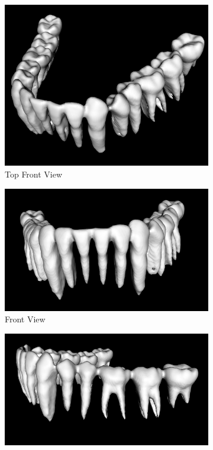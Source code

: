 \documentclass[11.5pt, b5paper]{article}
\begin{document}
\begin{figure}
    \centering
    \begin{subfigure}[b]{0.5\textwidth}
        \centering
        \includegraphics[width=\textwidth]{MCF1}
        \caption{Top Front View}
    \end{subfigure}
    \hfill
    \begin{subfigure}[b]{0.5\textwidth}
        \centering
        \includegraphics[width=\textwidth]{MCF2}
        \caption{Front View}
    \end{subfigure}
      \hfill
    \begin{subfigure}[b]{0.5\textwidth}
        \centering
        \includegraphics[width=\textwidth]{MCS1}

\end{subfigure}
\end{figure}
\end{document}
